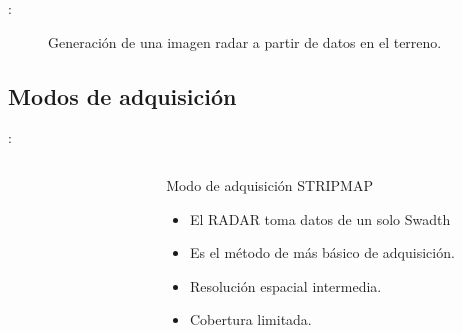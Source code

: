 \begin{frame}{\secname : \subsecname}
  \begin{figure}
    \centering
    \caption{Generación de una imagen radar a partir de datos en el terreno.}
    \label{}
  \end{figure}
\end{frame}

\subsection{Modos de adquisición}

\begin{frame}{\secname : \subsecname}
  \begin{columns}
    \begin{column}{0.5\textwidth}
       \begin{figure}
         \centering
         \label{}
       \end{figure}
    \end{column}
    \begin{column}{0.5\textwidth}  %
      \begin{block}{Modo de adquisición STRIPMAP}
        \begin{itemize}
          \item El RADAR toma datos de un solo Swadth
          \item Es el método de más básico de adquisición.
          \item Resolución espacial intermedia.
          \item Cobertura limitada.
        \end{itemize}
      \end{block}
    \end{column}
    \end{columns}
\end{frame}

